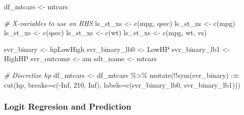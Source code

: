 \documentclass[
]{book}
\newenvironment{Shaded}{\begin{snugshade}}{\end{snugshade}}
\newcommand{\AttributeTok}[1]{\textcolor[rgb]{0.77,0.63,0.00}{#1}}
\newcommand{\CommentTok}[1]{\textcolor[rgb]{0.56,0.35,0.01}{\textit{#1}}}
\newcommand{\ConstantTok}[1]{\textcolor[rgb]{0.00,0.00,0.00}{#1}}
\newcommand{\DecValTok}[1]{\textcolor[rgb]{0.00,0.00,0.81}{#1}}
\newcommand{\ErrorTok}[1]{\textcolor[rgb]{0.64,0.00,0.00}{\textbf{#1}}}
\newcommand{\FunctionTok}[1]{\textcolor[rgb]{0.00,0.00,0.00}{#1}}
\newcommand{\NormalTok}[1]{#1}
\newcommand{\OtherTok}[1]{\textcolor[rgb]{0.56,0.35,0.01}{#1}}
\newcommand{\SpecialCharTok}[1]{\textcolor[rgb]{0.00,0.00,0.00}{#1}}
\newcommand{\StringTok}[1]{\textcolor[rgb]{0.31,0.60,0.02}{#1}}
\begin{document}
\begin{Shaded}
\begin{Highlighting}[]
\NormalTok{df\_mtcars }\OtherTok{\textless{}{-}}\NormalTok{ mtcars}

\CommentTok{\# X{-}variables to use on RHS}
\NormalTok{ls\_st\_xs }\OtherTok{\textless{}{-}} \FunctionTok{c}\NormalTok{(}\StringTok{\textquotesingle{}mpg\textquotesingle{}}\NormalTok{, }\StringTok{\textquotesingle{}qsec\textquotesingle{}}\NormalTok{)}
\NormalTok{ls\_st\_xs }\OtherTok{\textless{}{-}} \FunctionTok{c}\NormalTok{(}\StringTok{\textquotesingle{}mpg\textquotesingle{}}\NormalTok{)}
\NormalTok{ls\_st\_xs }\OtherTok{\textless{}{-}} \FunctionTok{c}\NormalTok{(}\StringTok{\textquotesingle{}qsec\textquotesingle{}}\NormalTok{)}
\NormalTok{ls\_st\_xs }\OtherTok{\textless{}{-}} \FunctionTok{c}\NormalTok{(}\StringTok{\textquotesingle{}wt\textquotesingle{}}\NormalTok{)}
\NormalTok{ls\_st\_xs }\OtherTok{\textless{}{-}} \FunctionTok{c}\NormalTok{(}\StringTok{\textquotesingle{}mpg\textquotesingle{}}\NormalTok{, }\StringTok{\textquotesingle{}wt\textquotesingle{}}\NormalTok{, }\StringTok{\textquotesingle{}vs\textquotesingle{}}\NormalTok{)}

\NormalTok{svr\_binary }\OtherTok{\textless{}{-}} \StringTok{\textquotesingle{}hpLowHigh\textquotesingle{}}
\NormalTok{svr\_binary\_lb0 }\OtherTok{\textless{}{-}} \StringTok{\textquotesingle{}LowHP\textquotesingle{}}
\NormalTok{svr\_binary\_lb1 }\OtherTok{\textless{}{-}} \StringTok{\textquotesingle{}HighHP\textquotesingle{}}
\NormalTok{svr\_outcome }\OtherTok{\textless{}{-}} \StringTok{\textquotesingle{}am\textquotesingle{}}
\NormalTok{sdt\_name }\OtherTok{\textless{}{-}} \StringTok{\textquotesingle{}mtcars\textquotesingle{}}

\CommentTok{\# Discretize hp}
\NormalTok{df\_mtcars }\OtherTok{\textless{}{-}}\NormalTok{ df\_mtcars }\SpecialCharTok{\%\textgreater{}\%}
    \FunctionTok{mutate}\NormalTok{(}\SpecialCharTok{!!}\FunctionTok{sym}\NormalTok{(svr\_binary) }\SpecialCharTok{:}\ErrorTok{=} \FunctionTok{cut}\NormalTok{(hp,}
                           \AttributeTok{breaks=}\FunctionTok{c}\NormalTok{(}\SpecialCharTok{{-}}\ConstantTok{Inf}\NormalTok{, }\DecValTok{210}\NormalTok{, }\ConstantTok{Inf}\NormalTok{),}
                           \AttributeTok{labels=}\FunctionTok{c}\NormalTok{(svr\_binary\_lb0, svr\_binary\_lb1)))}
\end{Highlighting}
\end{Shaded}

\hypertarget{logit-regresion-and-prediction}{%
\subsubsection{Logit Regresion and Prediction}\label{logit-regresion-and-prediction}}
\end{document}
